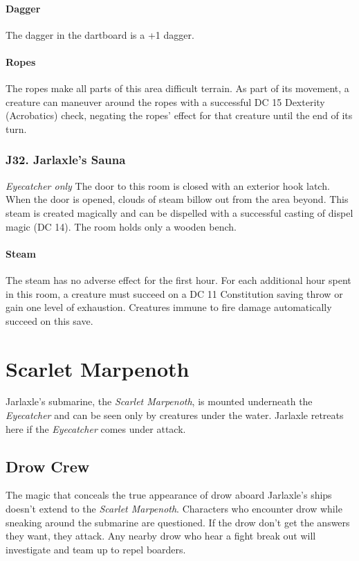 \documentclass[10pt,a4paper,twoside,twocolumn,openany,nodeprecatedcode]{dndbook}
\begin{document}
\paragraph{Dagger}
The dagger in the dartboard is a +1 dagger.
\paragraph{Ropes}
The ropes make all parts of this area difficult terrain. As part of its movement, a creature can maneuver around the ropes with a successful DC 15 Dexterity (Acrobatics) check, negating the ropes' effect for that creature until the end of its turn.
\subsubsection{J32. Jarlaxle's Sauna}
\textit{Eyecatcher only}
The door to this room is closed with an exterior hook latch. When the door is opened, clouds of steam billow out from the area beyond. This steam is created magically and can be dispelled with a successful casting of dispel magic (DC 14). The room holds only a wooden bench.
\paragraph{Steam}
The steam has no adverse effect for the first hour. For each additional hour spent in this room, a creature must succeed on a DC 11 Constitution saving throw or gain one level of exhaustion. Creatures immune to fire damage automatically succeed on this save.
\section{Scarlet Marpenoth}
Jarlaxle's submarine, the \textit{Scarlet Marpenoth}, is mounted underneath the \textit{Eyecatcher} and can be seen only by creatures under the water. Jarlaxle retreats here if the \textit{Eyecatcher} comes under attack.
\subsection{Drow Crew}
The magic that conceals the true appearance of drow aboard Jarlaxle's ships doesn't extend to the \textit{Scarlet Marpenoth}. Characters who encounter drow while sneaking around the submarine are questioned. If the drow don't get the answers they want, they attack. Any nearby drow who hear a fight break out will investigate and team up to repel boarders.
\end{document}
